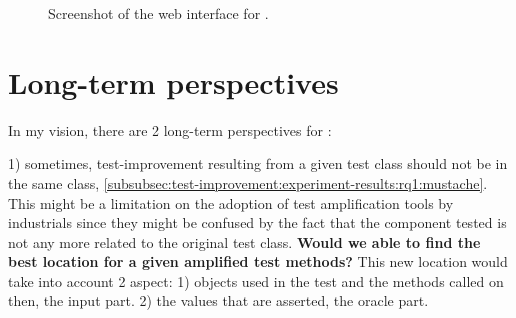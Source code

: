 \begin{figure}
	\centering
	\caption{Screenshot of the web interface for \dspot.}
	\label{fig:dspot-web}
\end{figure}

\section{Long-term perspectives}
\label{sec:conclusion:long-prespectives}

In my vision, there are 2 long-term perspectives for \dspot:

1) sometimes, test-improvement resulting from a given test class should not be in the same class, \eg \autoref{subsubsec:test-improvement:experiment-results:rq1:mustache}.
This might be a limitation on the adoption of test amplification tools by industrials since they might be confused by the fact that the component tested is not any more related to the original test class.
\textbf{Would we able to find the best location for a given amplified test methods?}
This new location would take into account 2 aspect:
1) objects used in the test and the methods called on then, \ie the input part.
2) the values that are asserted, \ie the oracle part.

